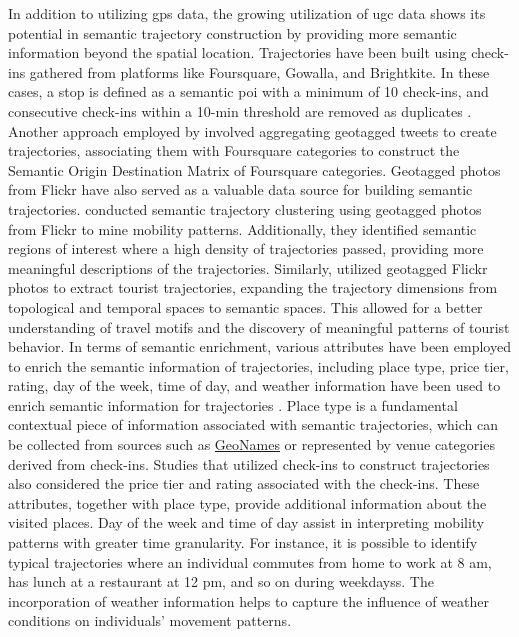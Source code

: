 \documentclass{article}
\theoremstyle{definition}
\theoremstyle{remark}
\begin{document}
In addition to utilizing \acrshort{gps} data, the growing utilization of \acrshort{ugc} data shows its potential in semantic trajectory construction by providing more semantic information beyond the spatial location. Trajectories have been built using check-ins gathered from platforms like Foursquare, Gowalla, and Brightkite. In these cases, a stop is defined as a semantic \acrshort{poi} with a minimum of 10 check-ins, and consecutive check-ins within a 10-min threshold are removed as duplicates \citep{petry_towards_2019,ferrero_mastermovelets_2020}. Another approach employed by \cite{nin_tweets_2014} involved aggregating geotagged tweets to create trajectories, associating them with Foursquare categories to construct the Semantic Origin Destination Matrix of Foursquare categories. Geotagged photos from Flickr have also served as a valuable data source for building semantic trajectories. \cite{cai_mining_2018} conducted semantic trajectory clustering using geotagged photos from Flickr to mine mobility patterns. Additionally, they identified semantic regions of interest where a high density of trajectories passed, providing more meaningful descriptions of the trajectories. Similarly, \cite{yang_quantifying_2017} utilized geotagged Flickr photos to extract tourist trajectories, expanding the trajectory dimensions from topological and temporal spaces to semantic spaces. This allowed for a better understanding of travel motifs and the discovery of meaningful patterns of tourist behavior. In terms of semantic enrichment, various attributes have been employed to enrich the semantic information of trajectories, including place type, price tier, rating, day of the week, time of day, and weather information have been used to enrich semantic information for trajectories \cite{cai_mining_2018,petry_towards_2019,liu_stccd_2020,ferrero_mastermovelets_2020}. Place type is a fundamental contextual piece of information associated with semantic trajectories, which can be collected from sources such as \href{http://www.geonames.org/}{GeoNames} or represented by venue categories derived from check-ins. Studies that utilized check-ins to construct trajectories also considered the price tier and rating associated with the check-ins. These attributes, together with place type, provide additional information about the visited places. Day of the week and time of day assist in interpreting mobility patterns with greater time granularity. For instance, it is possible to identify typical trajectories where an individual commutes from home to work at 8 am, has lunch at a restaurant at 12 pm, and so on during weekdayss. The incorporation of weather information helps to capture the influence of weather conditions on individuals' movement patterns.
\end{document}
